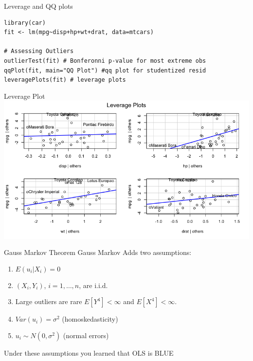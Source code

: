 \documentclass[aspectratio=169]{beamer}
\begin{document}
\begin{frame}[fragile]{Leverage and QQ plots}
\begin{verbatim}
library(car)
fit <- lm(mpg~disp+hp+wt+drat, data=mtcars)

# Assessing Outliers
outlierTest(fit) # Bonferonni p-value for most extreme obs
qqPlot(fit, main="QQ Plot") #qq plot for studentized resid 
leveragePlots(fit) # leverage plots
\end{verbatim}
\end{frame}

\begin{frame}{Leverage Plot}
\includegraphics[width=5.5in]{./resources/leverage_plot.png}
\end{frame}




\begin{frame}{Gauss Markov Theorem}
Gauss Markov Adds two assumptions:
\begin{enumerate}
\item $E(u_i |X_i ) = 0$
\item $(X_i,Y_i)$, $i =1,\ldots,n$, are i.i.d.
\item Large outliers are rare $E[Y^4]< \infty$ and $E[X^4]<\infty$.
\item $Var(u_i) = \sigma^2$ (homoskedasticity)
\item $u_i \sim N(0,\sigma^2)$ (normal errors)
\end{enumerate}
Under these assumptions you learned that OLS is \alert{BLUE}
\end{frame}
\end{document}
